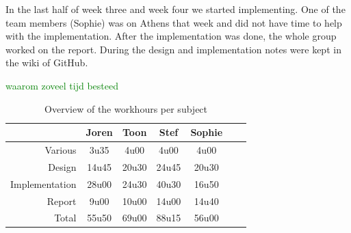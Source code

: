 \documentclass[i2]{oss}
\newcommand{\comment}[1]{{\huge \textcolor{green}{#1}}\\}
\begin{document}
In the last half of week three and week four we started implementing. One of the team members (Sophie) was on Athens that week and did not have time to help with the implementation. After the implementation was done, the whole group worked on the report. During the design and implementation notes were kept in the wiki of GitHub.

\comment{waarom zoveel tijd besteed}

\begin{table}[h!]
\begin{center}
    \begin{tabular}{ r | c  c  c  c  c  c}
     & Joren & Toon & Stef & Sophie \\ \hline
    Various & 3u35 & 4u00 & 4u00 & 4u00\\
        Design & 14u45 & 20u30 & 24u45 & 20u30 \\
        Implementation & 28u00 & 24u30 & 40u30 & 16u50\\
        Report & 9u00 & 10u00 & 14u00 & 14u40 \\
        Total & 55u50 & 69u00 & 88u15 & 56u00  
    \end{tabular}
    \caption{Overview of the workhours per subject}
    \label{tab:werkuren}
\end{center}
\end{table}
\end{document}
